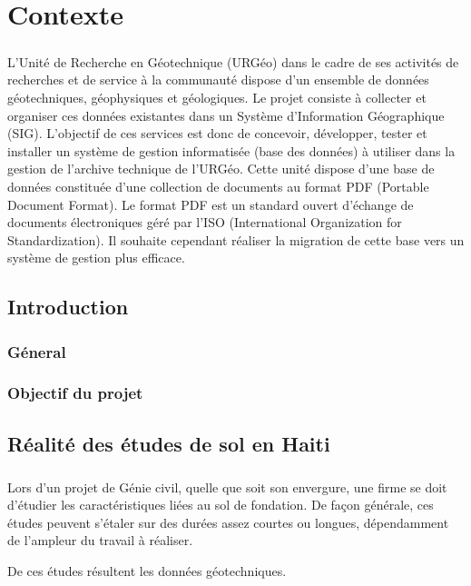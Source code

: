 \chapter{Contexte}
\paragraph{}
L’Unité de Recherche en Géotechnique (URGéo) dans le cadre de ses activités de recherches et de service à
la communauté dispose d’un ensemble de données géotechniques, géophysiques et géologiques. Le projet
consiste à collecter et organiser ces données existantes dans un Système d’Information Géographique (SIG).
L’objectif de ces services est donc de concevoir, développer, tester et installer un système de gestion
informatisée (base des données) à utiliser dans la gestion de l’archive technique de l’URGéo. Cette unité
dispose d'une base de données constituée d’une collection de documents au format PDF (Portable Document
Format). Le format PDF est un standard ouvert d'échange de documents électroniques géré par l’ISO
(International Organization for Standardization). Il souhaite cependant réaliser la migration de cette base vers
un système de gestion plus efficace.
    \section{Introduction}
        \subsection{Géneral}
        \lipsum[1]
        \subsection{Objectif du projet}
        \lipsum[1]
    \section{Réalité des études de sol en Haiti}
    \paragraph{}
    Lors d'un projet de Génie civil, quelle que soit son envergure, une firme se doit d'étudier 
    les caractéristiques liées au sol de fondation. De façon générale, ces études peuvent s'étaler 
    sur des durées assez courtes ou longues, dépendamment de l'ampleur du travail à réaliser. \par 
    De ces études résultent les données géotechniques.
